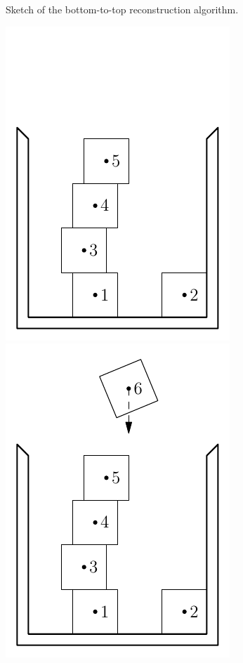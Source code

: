 \documentclass[12pt, sumlimits, intlimits]{article}
\begin{document}
\begin{figure}
\caption{Sketch of the bottom-to-top reconstruction algorithm.}
\label{f/btr}
\end{figure}

\begin{figure}
\centering
\def \w{0.25\columnwidth}
\includegraphics[width=\w]{dem-0}%
\includegraphics[width=\w]{dem-1}%

\end{figure}
\end{document}
